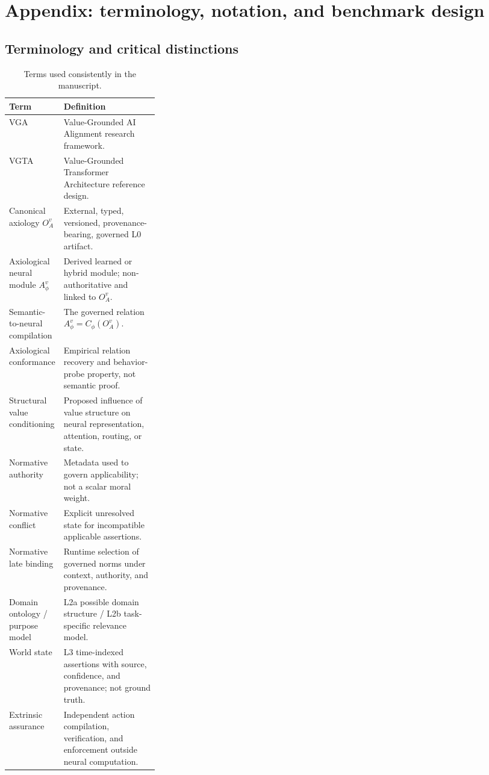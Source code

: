 \section{Appendix: terminology, notation, and benchmark design}
\label{sec:appendix}

\subsection{Terminology and critical distinctions}

\begin{table}[ht]
\centering
\scriptsize
\caption{Terms used consistently in the manuscript.}
\label{tab:terms}
\begin{tabularx}{\linewidth}{@{}p{0.29\linewidth}X@{}}
\toprule
Term & Definition \\
\midrule
VGA & Value-Grounded AI Alignment research framework. \\
VGTA & Value-Grounded Transformer Architecture reference design. \\
Canonical axiology $O_A^v$ & External, typed, versioned, provenance-bearing, governed L0 artifact. \\
Axiological neural module $A_\phi^v$ & Derived learned or hybrid module; non-authoritative and linked to $O_A^v$. \\
Semantic-to-neural compilation & The governed relation $A_\phi^v=C_\phi(O_A^v)$. \\
Axiological conformance & Empirical relation recovery and behavior-probe property, not semantic proof. \\
Structural value conditioning & Proposed influence of value structure on neural representation, attention, routing, or state. \\
Normative authority & Metadata used to govern applicability; not a scalar moral weight. \\
Normative conflict & Explicit unresolved state for incompatible applicable assertions. \\
Normative late binding & Runtime selection of governed norms under context, authority, and provenance. \\
Domain ontology / purpose model & L2a possible domain structure / L2b task-specific relevance model. \\
World state & L3 time-indexed assertions with source, confidence, and provenance; not ground truth. \\
Extrinsic assurance & Independent action compilation, verification, and enforcement outside neural computation. \\
\bottomrule
\end{tabularx}
\end{table}

